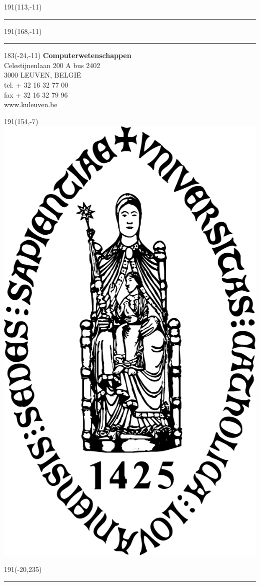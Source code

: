 \documentclass[12pt,a4paper,oneside]{book}
\begin{document}
\newpage
\thispagestyle{empty}
\sffamily
%
\begin{textblock}{191}(113,-11)
{\color{blueline}\rule{160pt}{5.5pt}}
\end{textblock}
%
\begin{textblock}{191}(168,-11)
{\color{blueline}\rule{5.5pt}{59pt}}
\end{textblock}
%
\begin{textblock}{183}(-24,-11)
\textblockcolour{}
\flushright
\fontsize{7}{7.5}\selectfont
\textbf{Computerwetenschappen}\\
Celestijnenlaan 200 A bus 2402\\
3000 LEUVEN, BELGI\"{E}\\
tel. + 32 16 32 77 00\\
fax + 32 16 32 79 96\\
www.kuleuven.be\\
\end{textblock}
%
\begin{textblock}{191}(154,-7)
\textblockcolour{}
\includegraphics*[height=16.5truemm]{sedes}
\end{textblock}
%
\begin{textblock}{191}(-20,235)
{\color{bluetitle}\rule{544pt}{55pt}}
\end{textblock}
\end{document}
